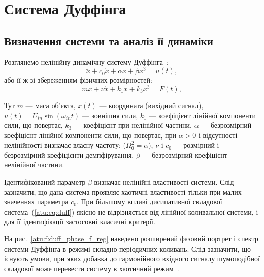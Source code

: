 
\FloatBarrier

\section{Система Дуффінга} %
\label{atu:sect:duff}


\subsection{Визначення системи та аналіз її динаміки} %

Розглянемо нелінійну динамічну систему Дуффінга~\cite{magni_theory_dyn_chaos,atu_asau12}:
%
\begin{equation}
 \ddot{x} + c_0 \dot{x} + \alpha x + \beta x^3 = u(t) ,
\label{atu:eq:duff}
\end{equation}
%
або її ж зі збереженням фізичних розмірностей:
%
\begin{equation}
 m \ddot{x} + \nu \dot{x} + k_1 x + k_3 x^3 = F(t) ,
\label{atu:eq:duff_phys}
\end{equation}

Тут
$ m $ --- маса об'єкта,
$ x (t) $ --- координата (вихідний сигнал),
$ u (t) = U_{in} \sin (\omega_{in} t) $ --- зовнішня сила,
$ k_1 $ --- коефіцієнт лінійної компоненти сили, що повертає,
$ k_3 $ --- коефіцієнт при нелінійної частини,
$ \alpha $ --- безрозмірний коефіцієнт лінійної компоненти сили, що повертає, при
$ \alpha> 0 $ і відсутності нелінійності визначає власну частоту: ($ \Omega_0^2 = \alpha $),
$ \nu $ і $ c_0 $ --- розмірний і безрозмірний коефіцієнти демпфірування,
$ \beta $ --- безрозмірний коефіцієнт нелінійної частини.

Ідентифікований параметр
$ \beta $ визначає нелінійні властивості системи. Слід зазначити,
що дана система проявляє хаотичні властивості тільки при малих
значеннях параметра \(c_0\). При більшому впливі дисипативної
складової система~(\ref{atu:eq:duff}) якісно не відрізняється від
лінійної коливальної системи, і для її ідентифікації застосовні
класичні критерії.


На рис.~\ref{atu:f:duff_phase_f_reg} наведено розширений фазовий портрет
і спектр системи Дуффінга в режимі складно-періодичних
коливань. Слід зазначити, що існують умови, при яких добавка до
гармонійного вхідного сигналу шумоподібної складової може
перевести систему в хаотичний режим~\cite{atu_asau15}.

